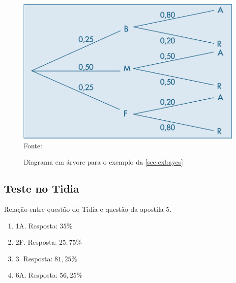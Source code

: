\documentclass[a4paper]{article}
\begin{document}
	\begin{figure}
		\centering
		\caption{Diagrama em árvore para o exemplo da \autoref{sec:exbayes}}
		\includegraphics[width=0.7\linewidth]{img/diagrama_bayes}
		\\ \vspace{1mm} Fonte: 
		\label{fig:diagramabayes}
	\end{figure}
	
	\subsection{Teste no Tidia}
	
	Relação entre questão do Tidia e questão da apostila 5.
	
	\begin{enumerate}
		\item 1A. Resposta: $35\%$
		\item 2F. Resposta: $25,75\%$
		\item 3. Resposta: $81,25\%$
		\item 6A. Resposta: $56,25\%$
	\end{enumerate}

	
	
	
		
	
\end{document}

